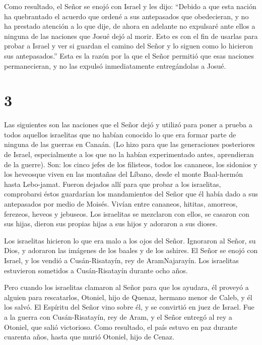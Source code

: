  Como resultado, el Señor se enojó con Israel y les dijo:
``Debido a que esta nación ha quebrantado el acuerdo que ordené a sus
antepasados que obedecieran, y no ha prestado atención a lo que dije,
 de ahora en adelante no expulsaré ante ellos a ninguna de
las naciones que Josué dejó al morir.  Esto es con el fin
de usarlas para probar a Israel y ver si guardan el camino del Señor y
lo siguen como lo hicieron sus antepasados.''  Esta es la
razón por la que el Señor permitió que esas naciones permanecieran, y no
las expulsó inmediatamente entregándolas a Josué.

\hypertarget{section-2}{%
\section{3}\label{section-2}}

 Las siguientes son las naciones que el Señor dejó y utilizó
para poner a prueba a todos aquellos israelitas que no habían conocido
lo que era formar parte de ninguna de las guerras en Canaán.
 (Lo hizo para que las generaciones posteriores de Israel,
especialmente a los que no la habían experimentado antes, aprendieran de
la guerre).  Son: los cinco jefes de los filisteos, todos
los cananeos, los sidonios y los heveosque viven en las montañas del
Líbano, desde el monte Baal-hermón hasta Lebo-jamat.  Fueron
dejados allí para que probar a los israelitas, comprobarsi éstos
guardarían los mandamientos del Señor que él había dado a sus
antepasados por medio de Moisés.  Vivían entre cananeos,
hititas, amorreos, ferezeos, heveos y jebuseos.  Los
israelitas se mezclaron con ellos, se casaron con sus hijas, dieron sus
propias hijas a sus hijos y adoraron a sus dioses.

 Los israelitas hicieron lo que era malo a los ojos del
Señor. Ignoraron al Señor, su Dios, y adoraron las imágenes de los
baales y de los ashires.  El Señor se enojó con Israel, y
los vendió a Cusán-Risatayín, rey de AramNajarayín. Los israelitas
estuvieron sometidos a Cusán-Risatayín durante ocho años.

 Pero cuando los israelitas clamaron al Señor para que los
ayudara, él proveyó a alguien para rescatarlos, Otoniel, hijo de Quenaz,
hermano menor de Caleb, y él los salvó.  El Espíritu del
Señor vino sobre él, y se convirtió en juez de Israel. Fue a la guerra
con Cusán-Risatayín, rey de Aram, y el Señor entregó al rey a Otoniel,
que salió victorioso.  Como resultado, el país estuvo en
paz durante cuarenta años, hasta que murió Otoniel, hijo de Cenaz.

